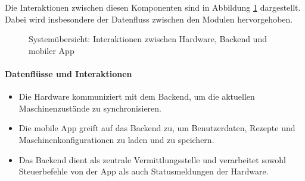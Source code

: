Die Interaktionen zwischen diesen Komponenten sind in Abbildung \ref{fig:system_overview} dargestellt. Dabei wird insbesondere der Datenfluss zwischen den Modulen hervorgehoben.

\vspace{1 cm}
\begin{figure}[htbp]
  \centering

	\caption{Systemübersicht: Interaktionen zwischen Hardware, Backend und mobiler App}
	\label{fig:system_overview}
\end{figure}
\vspace{1 cm}

\paragraph*{Datenflüsse und Interaktionen}

\begin{itemize}
  \item Die Hardware kommuniziert mit dem Backend, um die aktuellen Maschinenzustände zu synchronisieren.
  \item Die mobile App greift auf das Backend zu, um Benutzerdaten, Rezepte und Maschinenkonfigurationen zu laden und zu speichern.
  \item Das Backend dient als zentrale Vermittlungsstelle und verarbeitet sowohl Steuerbefehle von der App als auch Statusmeldungen der Hardware.
\end{itemize}

